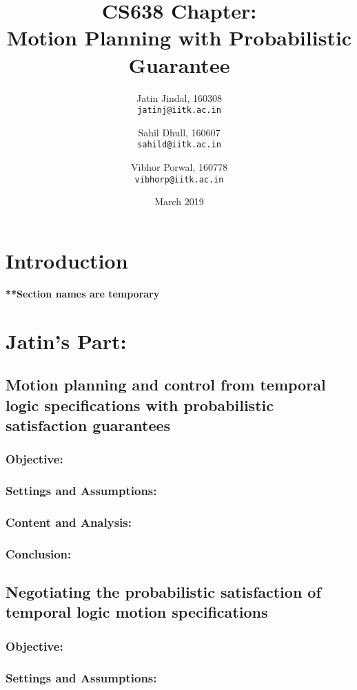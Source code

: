 \documentclass{article}
\title{
    CS638 Chapter: \\
    Motion Planning with Probabilistic Guarantee
}
\author{
    Jatin Jindal, 160308\\
    \texttt{jatinj@iitk.ac.in}
    \and
    Sahil Dhull, 160607\\
    \texttt{sahild@iitk.ac.in}
    \and
    Vibhor Porwal, 160778\\
    \texttt{vibhorp@iitk.ac.in}
}
\date{March 2019}
\theoremstyle{definition}
\begin{document}
\maketitle

\section{Introduction}
\textbf{**Section names are temporary}

\section{Jatin's Part:}
\subsection{Motion planning and control from temporal logic specifications with probabilistic satisfaction guarantees}
\subsubsection{Objective:}

\subsubsection{Settings and Assumptions:}

\subsubsection{Content and Analysis:}

\subsubsection{Conclusion:}

\subsection{Negotiating the probabilistic satisfaction of temporal logic motion specifications}
\subsubsection{Objective:}

\subsubsection{Settings and Assumptions:}
\end{document}
